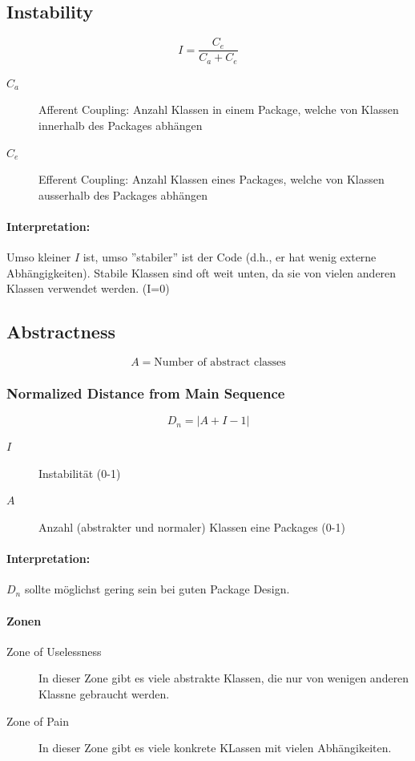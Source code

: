 \subsection{Instability}

\[
	I = \frac{C_e}{C_a + C_e}
\]

\begin{description}
	\item[$C_a$] Afferent Coupling: Anzahl Klassen in einem Package, welche von Klassen innerhalb des Packages abhängen
	\item[$C_e$] Efferent Coupling: Anzahl Klassen eines Packages, welche von Klassen ausserhalb des Packages abhängen
\end{description}

\paragraph{Interpretation:} Umso kleiner $I$ ist, umso ''stabiler'' ist der Code (d.h., er hat wenig externe Abhängigkeiten). Stabile Klassen sind oft weit unten, da sie von vielen anderen Klassen verwendet werden. (I=0)

\subsection{Abstractness}
\[
A = \text{Number of abstract classes}
\]


\subsubsection{Normalized Distance from Main Sequence}

\[
	D_n = \left| A + I - 1 \right|
\]

\begin{description}
	\item[$I$] Instabilität (0-1)
	\item[$A$] Anzahl (abstrakter und normaler) Klassen eine Packages (0-1)
\end{description}

\paragraph{Interpretation:} $D_n$ sollte möglichst gering sein bei guten Package Design.

\paragraph{Zonen}
\begin{description}
	\item[Zone of Uselessness] In dieser Zone gibt es viele abstrakte Klassen, die nur von wenigen anderen Klassne gebraucht werden.
	\item[Zone of Pain] In dieser Zone gibt es viele konkrete KLassen mit vielen Abhängikeiten.
\end{description}

